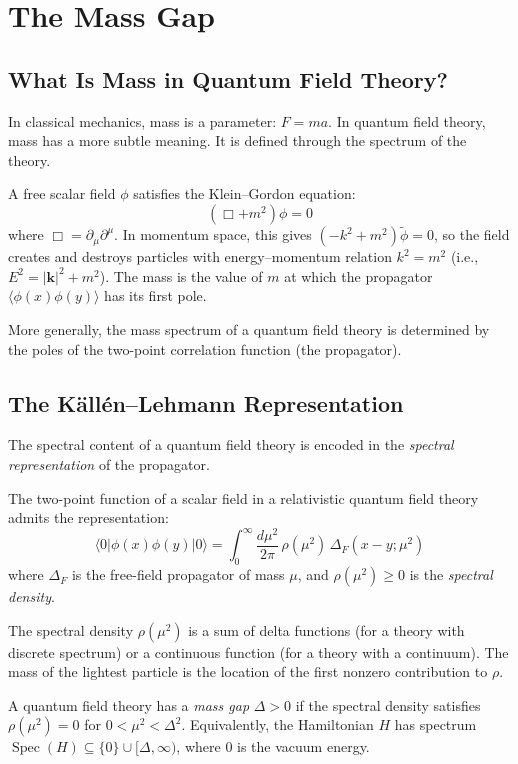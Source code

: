 \section{The Mass Gap}

\subsection{What Is Mass in Quantum Field Theory?}

In classical mechanics, mass is a parameter: $F = ma$. In quantum field theory, mass has a more subtle meaning. It is defined through the spectrum of the theory.

A free scalar field $\phi$ satisfies the Klein--Gordon equation:
\[
(\Box + m^2)\phi = 0
\]
where $\Box = \partial_\mu \partial^\mu$. In momentum space, this gives $(-k^2 + m^2)\tilde{\phi} = 0$, so the field creates and destroys particles with energy--momentum relation $k^2 = m^2$ (i.e., $E^2 = |\mathbf{k}|^2 + m^2$). The mass is the value of $m$ at which the propagator $\langle\phi(x)\phi(y)\rangle$ has its first pole.

More generally, the mass spectrum of a quantum field theory is determined by the poles of the two-point correlation function (the propagator).

\subsection{The K\"{a}ll\'{e}n--Lehmann Representation}

The spectral content of a quantum field theory is encoded in the \textit{spectral representation} of the propagator.

\begin{theorem}[K\"{a}ll\'{e}n--Lehmann]
The two-point function of a scalar field in a relativistic quantum field theory admits the representation:
\[
\langle 0 | \phi(x) \phi(y) | 0 \rangle = \int_0^\infty \frac{d\mu^2}{2\pi} \, \rho(\mu^2) \, \Delta_F(x - y; \mu^2)
\]
where $\Delta_F$ is the free-field propagator of mass $\mu$, and $\rho(\mu^2) \ge 0$ is the \textit{spectral density}.
\end{theorem}

The spectral density $\rho(\mu^2)$ is a sum of delta functions (for a theory with discrete spectrum) or a continuous function (for a theory with a continuum). The mass of the lightest particle is the location of the first nonzero contribution to $\rho$.

\begin{definition}
A quantum field theory has a \textit{mass gap} $\Delta > 0$ if the spectral density satisfies $\rho(\mu^2) = 0$ for $0 < \mu^2 < \Delta^2$. Equivalently, the Hamiltonian $H$ has spectrum $\operatorname{Spec}(H) \subseteq \{0\} \cup [\Delta, \infty)$, where $0$ is the vacuum energy.
\end{definition}

